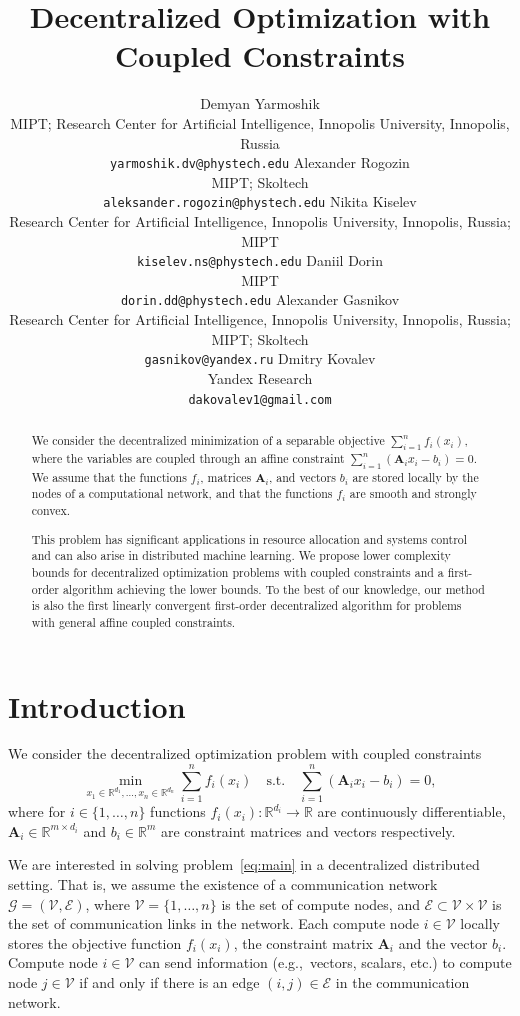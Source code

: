 \documentclass{article}
\title{Decentralized Optimization with Coupled Constraints}
\author{
    \hspace{-0.08cm}Demyan Yarmoshik \\
	MIPT; Research Center for Artificial Intelligence, Innopolis University, Innopolis, Russia \\
	\texttt{yarmoshik.dv@phystech.edu}
	\And
	Alexander Rogozin \\
	  MIPT; Skoltech \\
	\texttt{aleksander.rogozin@phystech.edu}
	\AND
	Nikita Kiselev \\
	  Research Center for Artificial Intelligence, Innopolis University, Innopolis, Russia; MIPT \\
	\texttt{kiselev.ns@phystech.edu}
	\And
	  Daniil Dorin \\
	  MIPT \\
	\texttt{dorin.dd@phystech.edu}
	\AND
	  Alexander Gasnikov \\
	  Research Center for Artificial Intelligence, Innopolis University, Innopolis, Russia; MIPT; Skoltech \\
	\texttt{gasnikov@yandex.ru}
	\And
	Dmitry Kovalev \\
	Yandex Research \\
	\texttt{dakovalev1@gmail.com}
}
\newcommand{\R}{\mathbb{R}}
\newcommand{\rng}[2]{\{#1,\ldots,#2\}}
\newcommand{\cG}{\mathcal{G}}
\newcommand{\cV}{\mathcal{V}}
\newcommand{\cE}{\mathcal{E}}
\newcommand{\mA}{\mathbf{A}}
\begin{document}
\maketitle

\begin{abstract}
We consider the decentralized minimization of a separable objective $\sum_{i=1}^{n} f_i(x_i)$, where the variables are coupled through an affine constraint $\sum_{i=1}^n\left(\mathbf{A}_i x_i - b_i\right) = 0$.
We assume that the functions $f_i$, matrices $\mathbf{A}_i$, and vectors $b_i$ are stored locally by the nodes of a computational network, and that the functions $f_i$ are smooth and strongly convex. 

This problem has significant applications in resource allocation and systems control and can also arise in distributed machine learning.
We propose lower complexity bounds for decentralized optimization problems with coupled constraints and a first-order algorithm achieving the lower bounds. To the best of our knowledge, our method is also the first linearly convergent first-order decentralized algorithm for problems with general affine coupled constraints.
\end{abstract}


\section{Introduction}\label{sec:intro}
We consider the decentralized optimization problem with coupled constraints 
\begin{equation}\label{eq:main}
  \min_{x_1 \in \R^{d_1},\ldots,x_n \in \R^{d_n}} \sum_{i=1}^{n} f_i(x_i) \quad \text{s.t.} \quad \sum_{i=1}^{n} (\mA_i x_i - b_i) = 0,
\end{equation}
where for $i \in \rng{1}{n}$ functions $f_i(x_i) \colon \R^{d_i} \to \R$ are continuously differentiable,
$\mA_i \in \R^{m \times d_i}$ and $b_i \in \R^m$  are constraint matrices and vectors respectively.

We are interested in solving problem~\eqref{eq:main} in a decentralized distributed setting. That is, we assume the existence of a communication network $\cG = (\cV, \cE)$, where $\cV = \rng{1}{n}$ is the set of compute nodes, and $\cE \subset \cV \times \cV$ is the set of communication links in the network. Each compute node $i \in \cV$ locally stores the objective function $f_i(x_i)$, the constraint matrix $\mA_i$ and the vector $b_i$. 
Compute node $i \in \cV$ can send information (e.g.,~vectors, scalars, etc.) to compute node $j \in \cV$ if and only if there is an edge $(i, j) \in \cE$ in the communication network.
\end{document}
